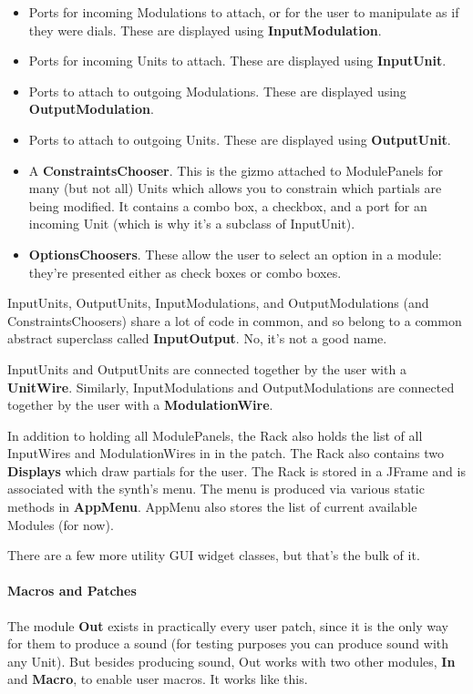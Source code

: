 \documentclass{article}
\begin{document}
\begin{itemize}
\item Ports for incoming Modulations to attach, or for the user to manipulate as if they were dials.  These are displayed using {\bf InputModulation}.
\item Ports for incoming Units to attach.  These are displayed using {\bf InputUnit}.
\item Ports to attach to outgoing Modulations.  These are displayed using {\bf OutputModulation}.
\item Ports to attach to outgoing Units.  These are displayed using {\bf OutputUnit}.
\item A {\bf ConstraintsChooser}.  This is the gizmo attached to ModulePanels for many (but not all) Units which allows you to constrain which partials are being modified.  It contains a combo box, a checkbox, and a port for an incoming Unit (which is why it's a subclass of InputUnit).
\item {\bf OptionsChoosers}.  These allow the user to select an option in a module: they're presented either as check boxes or combo boxes.
\end{itemize}

InputUnits, OutputUnits, InputModulations, and OutputModulations (and ConstraintsChoosers) share a lot of code in common, and so belong to a common abstract superclass called {\bf InputOutput}.  No, it's not a good name.

InputUnits and OutputUnits are connected together by the user with a {\bf UnitWire}.  Similarly, InputModulations and OutputModulations are connected together by the user with a {\bf ModulationWire}.

In addition to holding all ModulePanels, the Rack also holds the list of all InputWires and ModulationWires in in the patch.  The Rack also contains two {\bf Displays} which draw partials for the user.   The Rack is stored in a JFrame and is associated with the synth's menu.  The menu is produced via various static methods in {\bf AppMenu}.  AppMenu also stores the list of current available Modules (for now).

There are a few more utility GUI widget classes, but that's the bulk of it.

\paragraph{Macros and Patches}

The module {\bf Out} exists in practically every user patch, since it is the only way for them to produce a sound (for testing purposes you can produce sound with any Unit).  But besides producing sound, Out works with two other modules, {\bf In} and {\bf Macro}, to enable user macros.  It works like this. 
\end{document}
